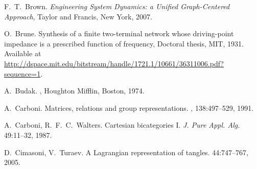\begin{thebibliography}{RSW00}
    F.\ T.\ Brown.
    \newblock \textsl{Engineering System Dynamics: a 
    Unified Graph-Centered Approach}, Taylor and Francis, New York, 2007. 

    O.\ Brune.
    \newblock Synthesis of a finite two-terminal network whose
    driving-point impedance is a prescribed function of frequency, Doctoral
    thesis, MIT, 1931.
    \newblock Available at
    \href{http://dspace.mit.edu/bitstream/handle/1721.1/10661/36311006.pdf?sequence=1}
    {http://dspace.mit.edu/bitstream/handle/1721.1/10661/36311006.pdf? sequence=1}.

%

    A.\ Budak.
    , Houghton Mifflin, Boston, 1974.




    A.\ Carboni.
    \newblock Matrices, relations and group representations.
    , 138:497--529, 1991.

    A.\ Carboni, R.\ F.\ C.\ Walters.
    \newblock Cartesian bicategories I.
    \newblock \textsl{J. Pure Appl. Alg.} { 49}:11--32, 1987. 

    D.\ Cimasoni, V.\ Turaev.
    \newblock A Lagrangian representation of tangles.
     { 44}:747--767, 2005. 
    

\end{thebibliography}
